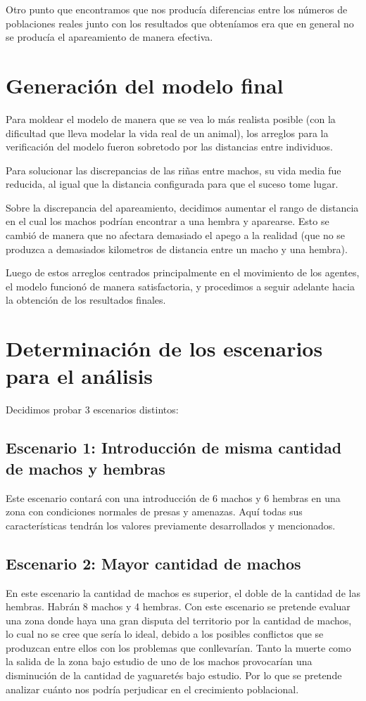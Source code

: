     Otro punto que encontramos que nos producía diferencias entre los números de poblaciones reales junto con los
resultados que obteníamos era que en general no se producía el apareamiento de manera efectiva.

\section{Generación del modelo final}

Para moldear el modelo de manera que se vea lo más realista posible (con la dificultad que lleva modelar la vida
real de un animal), los arreglos para la verificación del modelo fueron sobretodo por las distancias entre individuos.

Para solucionar las discrepancias de las riñas entre machos, su vida media fue reducida, al igual que la distancia
configurada para que el suceso tome lugar.

Sobre la discrepancia del apareamiento, decidimos aumentar el rango de distancia en el cual los machos podrían encontrar
a una hembra y aparearse. Esto se cambió de manera que no afectara demasiado el apego a la realidad (que no se produzca
a demasiados kilometros de distancia entre un macho y una hembra).

Luego de estos arreglos centrados principalmente en el movimiento de los agentes, el modelo funcionó de manera
satisfactoria, y procedimos a seguir adelante hacia la obtención de los resultados finales.

\section{Determinación de los escenarios para el análisis}

    Decidimos probar 3 escenarios distintos:

    \subsection{Escenario 1: Introducción de misma cantidad de machos y hembras}
        Este escenario contará con una introducción de 6 machos y 6 hembras en una zona con condiciones normales de presas y amenazas. Aquí todas sus características tendrán los valores previamente desarrollados y mencionados.

    \subsection{Escenario 2: Mayor cantidad de machos}
      En este escenario la cantidad de machos es superior, el doble de la cantidad de las hembras. Habrán 8 machos y 4 hembras. Con este escenario se pretende evaluar una zona donde haya una gran disputa del territorio por la cantidad de machos, lo cual no se cree que sería lo ideal, debido a los posibles conflictos que se produzcan entre ellos con los problemas que conllevarían. Tanto la muerte como la salida de la zona bajo estudio de uno de los machos provocarían una disminución de la cantidad de yaguaretés bajo estudio. Por lo que se pretende analizar cuánto nos podría perjudicar en el crecimiento poblacional.

